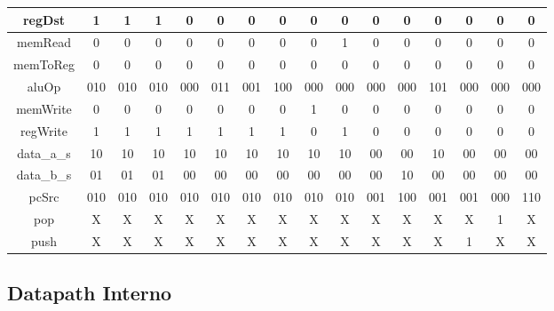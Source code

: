 \begin{center}
\begin{longtable}[pos]{| c | c | c | c | c | c | c | c | c | c | c | c | c | c | c | c |}
			\small regDst 			& 1   & 1   & 1   & 0   & 0   & 0   & 0   & 0   & 0   & 0   & 0   & 0   & 0   & 0   & 0   \\ \hline
            \small memRead 			& 0   & 0   & 0   & 0   & 0   & 0   & 0   & 0   & 1   & 0   & 0   & 0   & 0   & 0   & 0   \\ \hline
            \small memToReg 		& 0   & 0   & 0   & 0   & 0   & 0   & 0   & 0   & 0   & 0   & 0   & 0   & 0   & 0   & 0   \\ \hline
            \small aluOp 			& \small 010 & \small 010 & \small 010 & \small 000 & \small 011 & \small 001 & \small 100 & \small 000 & \small 000 & \small 000 & \small 000 & \small 101 & \small 000 & \small 000 & \small 000 \\ \hline
            \small memWrite 		& 0   & 0   & 0   & 0   & 0   & 0   & 0   & 1   & 0   & 0   & 0   & 0   & 0   & 0   & 0   \\ \hline
            \small regWrite 		& 1   & 1   & 1   & 1   & 1   & 1   & 1   & 0   & 1   & 0   & 0   & 0   & 0   & 0   & 0   \\ \hline
            \small data\_a\_s 		& 10  & 10  & 10  & 10  & 10  & 10  & 10  & 10  & 10  & 00  & 00  & 10  & 00  & 00  & 00  \\ \hline
            \small data\_b\_s 		& 01  & 01  & 01  & 00  & 00  & 00  & 00  & 00  & 00  & 00  & 10  & 00  & 00  & 00  & 00  \\ \hline
            \small pcSrc 			& \small 010 & \small 010 & \small 010 & \small 010   & \small 010 & \small 010 & \small 010 & \small 010 & \small 010 & \small 001 & \small 100 & \small 001 & \small 001 & \small 000 & \small 110 \\ \hline
            \small pop 				& X   & X   & X   & X   & X   & X   & X   & X   & X   & X   & X   & X   & X   & 1   & X   \\ \hline
            \small push 			& X   & X   & X   & X   & X   & X   & X   & X   & X   & X   & X   & X   & 1   & X   & X   \\ \hline

		\end{longtable}
	\end{center}
   
	
	\subsection{Datapath Interno}
	
